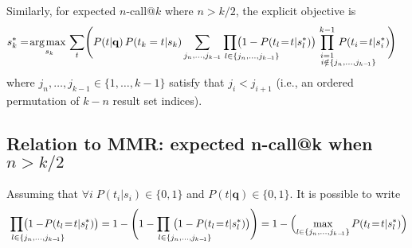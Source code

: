 \documentclass[a4paper]{article}
\renewcommand{\vec}[1]{\mathbf{#1}}
\def\argmax{\operatornamewithlimits{\!arg \;\! max\,}}
\begin{document}
Similarly, for expected $n$-call@$k$ where $n \! > \! k/2$, the explicit objective is
\begin{align}
  & s_k^* = \argmax_{s_k} \sum_t \Biggl( P(t|\vec{q}) \, P(t_k=t|s_k) \sum_{j_n, \dots, j_{k-\!1}} \hspace{-14mm} \prod_{\hspace{14.5mm} l \in \{j_n, \dots, j_{k-\!1}\}} \hspace{-14mm} \bigl(1 - P(t_l\!=\!t|s_l^*) \bigr) \hspace{-13mm} \prod_{\substack{i=1 \\ \hspace{14mm} i \notin \{j_n, \dots, j_{k-\!1}\}}}^{k-1} \hspace{-13mm} P(t_i\!=\!t|s_i^*) \!\Biggr) \label{eq.ncall.alt2}
\end{align}
where $j_n, \dots, j_{k-1} \in \{1,\ldots,k-1\}$ satisfy 
that $j_i < j_{i+1}$ (i.e.,
an ordered permutation of $k-n$ result set indices).

\subsection{Relation to MMR: expected n-call@k when $n>k/2$}

Assuming that $\forall i \; P(t_i|s_i) \in \{0,1\}$ and $P(t|\vec{q}) \in \{0,1\}$. It is possible to write
\begin{align*}
  \hspace{-13mm} \prod_{\hspace{14.5mm} l \in \{j_n, \dots, j_{k-\!1}\}} \hspace{-14mm} \bigl( 1 - \!P(t_l\!=\!t|s_l^*) \bigr) 
  = 1 - \Biggl( 1 - \hspace{-14mm} \prod_{\hspace{14.5mm} l \in \{j_n, \dots, j_{k-\!1}\}} \hspace{-13mm} \bigl( 1 - P(t_l\!=\!t|s_l^*) \bigr) \Biggr)
  = 1 - \Bigl( \max_{l \in \{j_n, \dots, j_{k-\!1}\}} P(t_l\!=\!t|s_l^*) \Bigr)
\end{align*}
\end{document}
